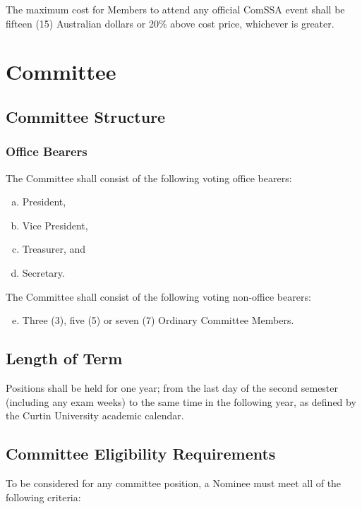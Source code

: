 \documentclass[a4paper,12pt]{article}
\begin{document}
The maximum cost for Members to attend any official ComSSA event shall be fifteen (15) Australian dollars or 20\% above cost price, whichever is greater.

\section{Committee}

\subsection{Committee Structure}

\subsubsection{Office Bearers}
\label{office_bearers}

The Committee shall consist of the following voting office bearers:

\begin{enumerate}[a)]
	\item President,
	\item Vice President,
	\item Treasurer, and
	\item Secretary.
\end{enumerate}

The Committee shall consist of the following voting non-office bearers:

\begin{enumerate}[a)]
	\setcounter{enumi}{4}
	\item Three (3), five (5) or seven (7) Ordinary Committee Members.
\end{enumerate}

\subsection{Length of Term}

Positions shall be held for one year; from the last day of the second semester (including any exam weeks) to the same time in the following year, as defined by the Curtin University academic calendar.

\subsection{Committee Eligibility Requirements}
\label{committee_eligibility}

To be considered for any committee position, a Nominee must meet all of the following criteria:
\end{document}
